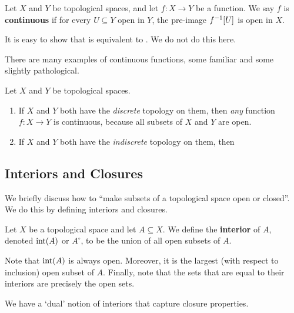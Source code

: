 \begin{boxdefinition}[Continuity]\label{Ch1:Def:Continuity_Topological}
    Let $X$ and $Y$ be topological spaces, and let $f : X \to Y$ be a function. We say $f$ is \textbf{continuous} if for every $U \subseteq Y$ open in $Y$, the pre-image $f^{-1}\!\left[ U \right]$ is open in $X$.
\end{boxdefinition}

It is easy to show that  is equivalent to . We do not do this here.

There are many examples of continuous functions, some familiar and some slightly pathological.

\begin{boxexample}
    Let $X$ and $Y$ be topological spaces.
    \begin{enumerate}
        \item If $X$ and $Y$ both have the \textit{discrete} topology on them, then \textit{any} function $f : X \to Y$ is continuous, because all subsets of $X$ and $Y$ are open.

        \item If $X$ and $Y$ both have the \textit{indiscrete} topology on them, then \sorry
    \end{enumerate}
\end{boxexample}

\subsection{Interiors and Closures}

We briefly discuss how to ``make subsets of a topological space open or closed''. We do this by defining interiors and closures.

\begin{boxdefinition}
    Let $X$ be a topological space and let $A \subseteq X$. We define the \textbf{interior} of $A$, denoted $\operatorname{int}\!\left( A \right)$ or $A^{\circ}$, to be the union of all open subsets of $A$.
\end{boxdefinition}

Note that $\operatorname{int}\!\left( A \right)$ is always open. Moreover, it is the largest (with respect to inclusion) open subset of $A$. Finally, note that the sets that are equal to their interiors are precisely the open sets.

We have a `dual' notion of interiors that capture closure properties.

